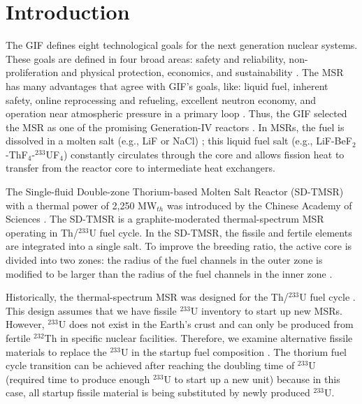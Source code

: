 \section{Introduction} \label{Introduction}
The \gls{GIF} defines eight technological goals for the next generation
nuclear systems. These goals are defined in four broad areas: safety and reliability, non-proliferation and physical protection, economics, and sustainability \cite{doe2002technology}. The \gls{MSR} has many advantages that agree
with \gls{GIF}'s goals, like: liquid fuel, inherent safety, online
reprocessing and refueling, excellent neutron economy, and operation near
atmospheric
pressure in a primary loop \cite{siemer2015molten,rosenthal1970molten}.
Thus, the \gls{GIF} selected the \gls{MSR} as one of the promising Generation-IV
reactors \cite{doe2002technology,pioro2016handbook}.
In \glspl{MSR}, the fuel is dissolved in a molten salt (e.g., LiF or NaCl) \cite{betzler_impacts_2019};
this liquid fuel salt (e.g., LiF-BeF$_2$-ThF$_4$-$^{233}$UF$_4$) constantly
circulates through the core and allows fission heat to transfer from the reactor
core to intermediate heat exchangers.

The Single-fluid Double-zone Thorium-based Molten Salt Reactor (SD-TMSR) with a thermal power of 2,250
MW$_{th}$ was introduced by the Chinese Academy of Sciences \cite{li_optimization_2018}. The
SD-TMSR
is a graphite-moderated thermal-spectrum \gls{MSR} operating in Th/$^{233}$U
fuel cycle. In the SD-TMSR, the fissile and fertile elements are integrated
into a single salt. To improve the breeding ratio, the active core is divided into two zones:
the radius of the fuel channels in the outer zone is modified to be larger
than the radius of the fuel channels in the inner zone \cite{nuttin2005potential,li_optimization_2018}.

Historically, the thermal-spectrum \gls{MSR} was designed for the Th/$^{233}$U
fuel cycle \cite{rykhlevskii2019modeling,nuttin2005potential,
	merle2004scenarios,rosenthal1970molten}. This design assumes that we have
fissile $^{233}$U inventory to start up new \glspl{MSR}. However, $^{233}$U does not
exist in the Earth's crust and can only be produced from fertile $^{232}$Th in 
specific nuclear facilities. Therefore, we examine alternative fissile
materials to replace the $^{233}$U in the startup fuel
composition \cite{betzler2016modeling,zou2018transition}. The thorium fuel
cycle transition can be achieved after reaching the doubling
time of $^{233}$U (required time to produce enough $^{233}$U to start up a new unit) because in this case, all startup fissile material
is being substituted by newly produced $^{233}$U.

